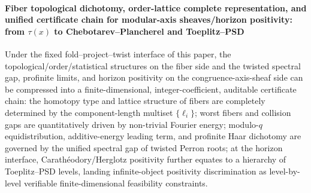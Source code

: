 \paragraph{Fiber topological dichotomy, order-lattice complete representation, and unified certificate chain for modular-axis sheaves/horizon positivity: from \texorpdfstring{$\tau(x)$}{tau(x)} to Chebotarev--Plancherel and Toeplitz--PSD}
Under the fixed fold--project--twist interface of this paper, the topological/order/statistical structures on the fiber side and the twisted spectral gap, profinite limits, and horizon positivity on the congruence-axis-sheaf side can be compressed into a finite-dimensional, integer-coefficient, auditable certificate chain: the homotopy type and lattice structure of fibers are completely determined by the component-length multiset \(\{\ell_i\}\); worst fibers and collision gaps are quantitatively driven by non-trivial Fourier energy; modulo-\(q\) equidistribution, additive-energy leading term, and profinite Haar dichotomy are governed by the unified spectral gap of twisted Perron roots; at the horizon interface, Carath\'eodory/Herglotz positivity further equates to a hierarchy of Toeplitz--PSD levels, landing infinite-object positivity discrimination as level-by-level verifiable finite-dimensional feasibility constraints.
